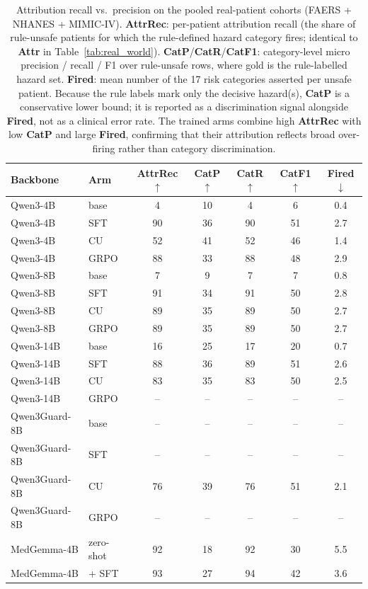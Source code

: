 \begin{table}[!t]
\centering\small
\setlength{\tabcolsep}{4pt}
\begin{tabular}{llccccc}
\toprule
\textbf{Backbone} & \textbf{Arm} & \textbf{AttrRec}$\uparrow$ & \textbf{CatP}$\uparrow$ & \textbf{CatR}$\uparrow$ & \textbf{CatF1}$\uparrow$ & \textbf{Fired}$\downarrow$ \\
\midrule
Qwen3-4B & base & 4 & 10 & 4 & 6 & 0.4 \\
Qwen3-4B & SFT & 90 & 36 & 90 & 51 & 2.7 \\
Qwen3-4B & CU & 52 & 41 & 52 & 46 & 1.4 \\
Qwen3-4B & GRPO & 88 & 33 & 88 & 48 & 2.9 \\
\midrule
Qwen3-8B & base & 7 & 9 & 7 & 7 & 0.8 \\
Qwen3-8B & SFT & 91 & 34 & 91 & 50 & 2.8 \\
Qwen3-8B & CU & 89 & 35 & 89 & 50 & 2.7 \\
Qwen3-8B & GRPO & 89 & 35 & 89 & 50 & 2.7 \\
\midrule
Qwen3-14B & base & 16 & 25 & 17 & 20 & 0.7 \\
Qwen3-14B & SFT & 88 & 36 & 89 & 51 & 2.6 \\
Qwen3-14B & CU & 83 & 35 & 83 & 50 & 2.5 \\
Qwen3-14B & GRPO & -- & -- & -- & -- & -- \\
\midrule
Qwen3Guard-8B & base & -- & -- & -- & -- & -- \\
Qwen3Guard-8B & SFT & -- & -- & -- & -- & -- \\
Qwen3Guard-8B & CU & 76 & 39 & 76 & 51 & 2.1 \\
Qwen3Guard-8B & GRPO & -- & -- & -- & -- & -- \\
\midrule
MedGemma-4B & zero-shot & 92 & 18 & 92 & 30 & 5.5 \\
MedGemma-4B & + SFT & 93 & 27 & 94 & 42 & 3.6 \\
\bottomrule
\end{tabular}
\caption{Attribution recall vs.\ precision on the pooled real-patient cohorts (FAERS + NHANES + MIMIC-IV). \textbf{AttrRec}: per-patient attribution recall (the share of rule-unsafe patients for which the rule-defined hazard category fires; identical to \textbf{Attr} in Table~\ref{tab:real_world}). \textbf{CatP}/\textbf{CatR}/\textbf{CatF1}: category-level micro precision / recall / F1 over rule-unsafe rows, where gold is the rule-labelled hazard set. \textbf{Fired}: mean number of the 17 risk categories asserted per unsafe patient. Because the rule labels mark only the decisive hazard(s), \textbf{CatP} is a conservative lower bound; it is reported as a discrimination signal alongside \textbf{Fired}, not as a clinical error rate. The trained arms combine high \textbf{AttrRec} with low \textbf{CatP} and large \textbf{Fired}, confirming that their attribution reflects broad over-firing rather than category discrimination.}
\label{tab:attr_precision}
\end{table}

